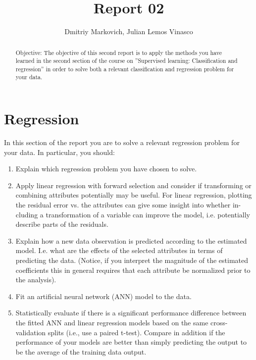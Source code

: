\documentclass[10pt, paper=a4]{article}
\begin{document}
\title{Report 02}

\author{Dmitriy Markovich, Julian Lemos Vinasco}

\date{}

\maketitle

\begin{abstract}
  Objective: The objective of this second report is to apply the
  methods you have learned in the second section of the course on
  ”Supervised learning: Classification and regression” in order to
  solve both a relevant classification and regression problem for your
  data.
\end{abstract}

\section{Regression}
\label{sec:regression}
In this section of the report you are to solve a relevant regression
problem for your data. In particular, you should:
\begin{enumerate}
\item Explain which regression problem you have chosen to solve.
\item Apply linear regression with forward selection and consider if
  transforming or combining attributes potentially may be useful. For
  linear regression, plotting the residual error vs. the attributes
  can give some insight into whether in- cluding a transformation of a
  variable can improve the model, i.e. potentially describe parts of
  the residuals.
\item Explain how a new data observation is predicted according to the
  estimated model. I.e. what are the effects of the selected
  attributes in terms of predicting the data.  (Notice, if you
  interpret the magnitude of the estimated coefficients this in
  general requires that each attribute be normalized prior to the
  analysis).
\item Fit an artificial neural network (ANN) model to the data.
\item Statistically evaluate if there is a significant performance
  difference between the fitted ANN and linear regression models based
  on the same cross-validation splits (i.e., use a paired
  t-test). Compare in addition if the performance of your models are
  better than simply predicting the output to be the average of the
  training data output.
\end{enumerate}
\end{document}
